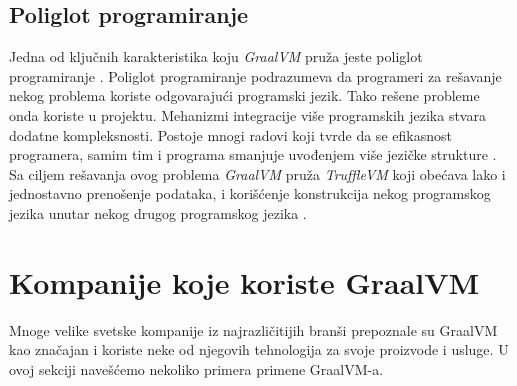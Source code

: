 \documentclass[a4paper]{article}
\begin{document}
\subsection{Poliglot programiranje}
\label{sub:poliglot}

Jedna od ključnih karakteristika koju \emph{GraalVM} pruža jeste poliglot programiranje \cite{graalvm}. Poliglot programiranje podrazumeva da programeri za rešavanje nekog problema koriste odgovarajući programski jezik. Tako rešene probleme onda koriste u projektu. Mehanizmi integracije više programskih jezika stvara dodatne kompleksnosti. Postoje mnogi radovi koji tvrde da se efikasnost programera, samim tim i programa smanjuje uvođenjem više jezičke strukture \cite{peterson21, hao20}. Sa ciljem rešavanja ovog problema \emph{GraalVM} pruža \emph{TruffleVM} koji obećava lako i jednostavno prenošenje podataka, i korišćenje konstrukcija nekog programskog jezika unutar nekog drugog programskog jezika \cite{grimmer15}.
\section{Kompanije koje koriste GraalVM}
\label{sec:comp}

Mnoge velike svetske kompanije iz najrazličitijih branši prepoznale su GraalVM kao značajan i koriste neke od njegovih tehnologija za svoje proizvode i usluge. U ovoj sekciji navešćemo nekoliko primera primene GraalVM-a.
\end{document}
